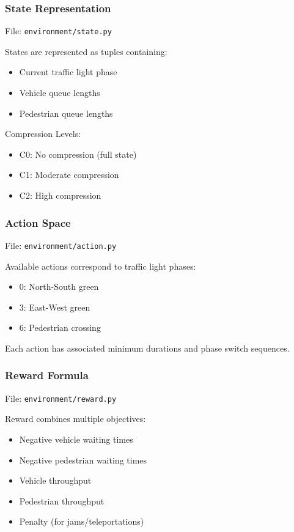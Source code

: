 \documentclass[a4paper]{report}
\begin{document}
\subsubsection{State Representation}

File: \texttt{environment/state.py}

\noindent
States are represented as tuples containing:
\begin{itemize}
    \item Current traffic light phase
    \item Vehicle queue lengths
    \item Pedestrian queue lengths
\end{itemize}

\noindent
Compression Levels:
\begin{itemize}
    \item C0: No compression (full state)
    \item C1: Moderate compression
    \item C2: High compression
\end{itemize}

\subsubsection{Action Space}

File: \texttt{environment/action.py}

\noindent
Available actions correspond to traffic light phases:
\begin{itemize}
    \item 0: North-South green
    \item 3: East-West green
    \item 6: Pedestrian crossing
\end{itemize}

\noindent
Each action has associated minimum durations and phase switch sequences.

\subsubsection{Reward Formula}

File: \texttt{environment/reward.py}

\noindent
Reward combines multiple objectives:
\begin{itemize}
    \item Negative vehicle waiting times
    \item Negative pedestrian waiting times
    \item Vehicle throughput
    \item Pedestrian throughput
    \item Penalty (for jams/teleportations)
\end{itemize}
\end{document}
